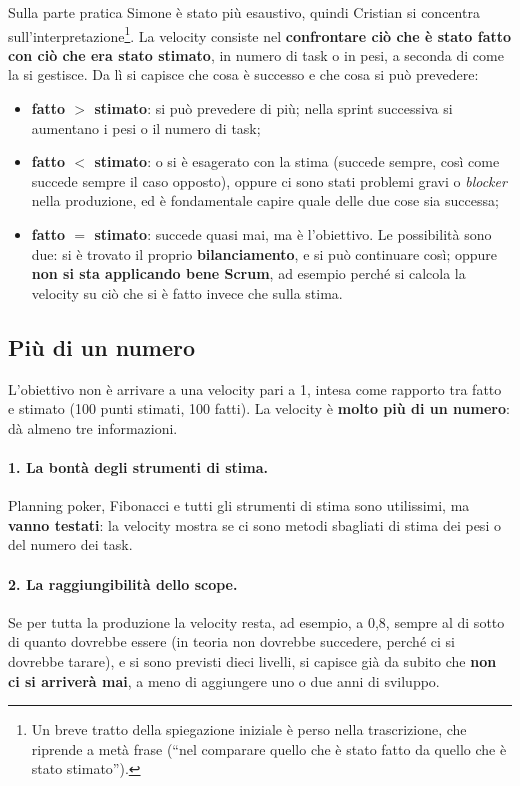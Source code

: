 Sulla parte pratica Simone è stato più esaustivo, quindi Cristian si concentra
sull'interpretazione\footnote{Un breve tratto della spiegazione iniziale è
perso nella trascrizione, che riprende a metà frase (``nel comparare quello
che è stato fatto da quello che è stato stimato'').}. La velocity consiste nel
\textbf{confrontare ciò che è stato fatto con ciò che era stato stimato}, in
numero di task o in pesi, a seconda di come la si gestisce. Da lì si capisce
che cosa è successo e che cosa si può prevedere:
\begin{itemize}
  \item \textbf{fatto $>$ stimato}: si può prevedere di più; nella sprint
        successiva si aumentano i pesi o il numero di task;
  \item \textbf{fatto $<$ stimato}: o si è esagerato con la stima (succede
        sempre, così come succede sempre il caso opposto), oppure ci sono stati
        problemi gravi o \emph{blocker} nella produzione, ed è fondamentale
        capire quale delle due cose sia successa;
  \item \textbf{fatto $=$ stimato}: succede quasi mai, ma è l'obiettivo. Le
        possibilità sono due: si è trovato il proprio \textbf{bilanciamento}, e
        si può continuare così; oppure \textbf{non si sta applicando bene
        Scrum}, ad esempio perché si calcola la velocity su ciò che si è fatto
        invece che sulla stima.
\end{itemize}

\subsection{Più di un numero}

L'obiettivo non è arrivare a una velocity pari a 1, intesa come rapporto tra
fatto e stimato (100 punti stimati, 100 fatti). La velocity è \textbf{molto più
di un numero}: dà almeno tre informazioni.

\paragraph{1. La bontà degli strumenti di stima.} Planning poker, Fibonacci e
tutti gli strumenti di stima sono utilissimi, ma \textbf{vanno testati}: la
velocity mostra se ci sono metodi sbagliati di stima dei pesi o del numero dei
task.

\paragraph{2. La raggiungibilità dello scope.} Se per tutta la produzione la
velocity resta, ad esempio, a 0,8, sempre al di sotto di quanto dovrebbe essere
(in teoria non dovrebbe succedere, perché ci si dovrebbe tarare), e si sono
previsti dieci livelli, si capisce già da subito che \textbf{non ci si
arriverà mai}, a meno di aggiungere uno o due anni di sviluppo.

